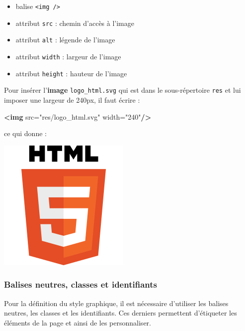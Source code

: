\documentclass[a4paper,17pt]{extarticle}
\providecommand{\tightlist}{%
      \setlength{\itemsep}{0pt}\setlength{\parskip}{0pt}}
\newenvironment{Shaded}{}{}
\newcommand{\KeywordTok}[1]{\textcolor[rgb]{0.00,0.44,0.13}{\textbf{{#1}}}}
\newcommand{\StringTok}[1]{\textcolor[rgb]{0.25,0.44,0.63}{{#1}}}
\newcommand{\OtherTok}[1]{\textcolor[rgb]{0.00,0.44,0.13}{{#1}}}
\begin{document}
\begin{itemize}
\tightlist
\item
  balise \texttt{\textless{}img\ /\textgreater{}}
\item
  attribut \texttt{src} : chemin d'accès à l'image
\item
  attribut \texttt{alt} : légende de l'image
\item
  attribut \texttt{width} : largeur de l'image
\item
  attribut \texttt{height} : hauteur de l'image
\end{itemize}
\begin{exemple}
    Pour insérer l'\textbf{image} \texttt{logo\_html.svg} qui est dans le
sous-répertoire \texttt{res} et lui imposer une largeur de 240px, il
faut écrire :

\begin{Shaded}
\begin{Highlighting}[]
\KeywordTok{\textless{}img}\OtherTok{ src=}\StringTok{"res/logo\_html.svg"}\OtherTok{ width=}\StringTok{"240"}\KeywordTok{/\textgreater{}}
\end{Highlighting}
\end{Shaded}

ce qui donne :

\includegraphics{res/logo_html.png}

            \end{exemple}
    \hypertarget{balises-neutres-classes-et-identifiants}{%
\subsubsection{Balises neutres, classes et
identifiants}\label{balises-neutres-classes-et-identifiants}}

    Pour la définition du style graphique, il est nécessaire d'utiliser les
balises neutres, les classes et les identifiants. Ces derniers
permettent d'étiqueter les éléments de la page et ainsi de les
personnaliser.
\end{document}
